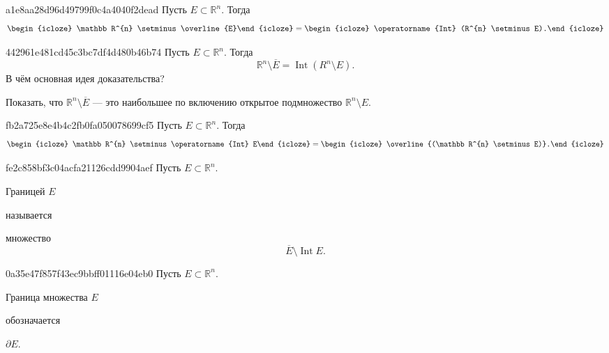 \begin{note}{a1e8aa28d96d49799f0c4a4040f2dead}
    Пусть \({ E \subset \mathbb R^{n} }\).
    Тогда
    \[
        \begin{icloze}{2}\mathbb R^{n} \setminus \overline{E}\end{icloze} = \begin{icloze}{1}\operatorname{Int} (R^{n} \setminus E).\end{icloze}
    \]
\end{note}

\begin{note}{442961e481cd45c3bc7df4d480b46b74}
    Пусть \({ E \subset \mathbb R^{n} }\).
    Тогда
    \[
        \mathbb R^{n} \setminus \overline{E} = \operatorname{Int} (R^{n} \setminus E).
    \]
    В чём основная идея доказательства?

    \begin{cloze}{1}
        Показать, что \({ \mathbb R^{n} \setminus \overline{E} }\) --- это наибольшее по включению открытое подмножество \({ \mathbb R^{n} \setminus E }\).
    \end{cloze}
\end{note}

\begin{note}{fb2a725e8e4b4c2fb0fa050078699cf5}
    Пусть \({ E \subset \mathbb R^{n} }\).
    Тогда
    \[
        \begin{icloze}{2}\mathbb R^{n} \setminus \operatorname{Int} E\end{icloze} = \begin{icloze}{1}\overline{(\mathbb R^{n} \setminus E)}.\end{icloze}
    \]
\end{note}

\begin{note}{fe2c858bf3c04acfa21126cdd9904aef}
    Пусть \({ E \subset \mathbb R^{n} }\).
    \begin{icloze}{2}Границей \({ E }\)\end{icloze} называется \begin{icloze}{1}
        множество
        \[
            \overline{E} \setminus \operatorname{Int} E.
        \]
    \end{icloze}
\end{note}

\begin{note}{0a35e47f857f43ec9bbff01116e04eb0}
    Пусть \({ E \subset \mathbb R^{n} }\).
    \begin{icloze}{1}Граница множества \({ E }\)\end{icloze} обозначается \begin{icloze}{2}\({ \partial E }\).\end{icloze}
\end{note}

